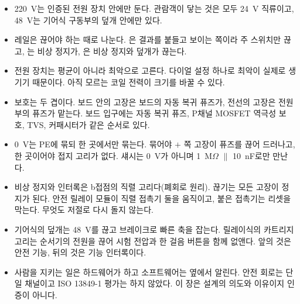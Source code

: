 \begin{itemize}
\item 220~V는 인증된 전원 장치 안에만 둔다. 관람객이 닿는 것은 모두 24~V 직류이고, 48~V는 기어식 구동부의 덮개 안에만 있다.
\item 레일은 끊어야 하는 때로 나눈다. 은 결과를 붙들고 보이는 쪽이라 주 스위치만 끊고, 는 비상 정지가, 은
비상 정지와 덮개가 끊는다.
\item 전원 장치는 평균이 아니라 최악으로 고른다. 다이얼 설정 하나로 최악이 실제로 생기기 때문이다. 아직 모르는 코일 전력이 크기를 바꿀 수 있다.
\item 보호는 두 겹이다. 보드 안의 고장은 보드의 자동 복귀 퓨즈가, 전선의 고장은 전원부의 퓨즈가 맡는다. 보드 입구에는 자동 복귀 퓨즈,
P채널 MOSFET 역극성 보호, TVS, 커패시터가 같은 순서로 있다.
\item 0~V는 PE에 묶되 한 곳에서만 묶는다. 묶어야 $+$ 쪽 고장이 퓨즈를 끊어 드러나고, 한 곳이어야 접지 고리가 없다. 섀시는 0~V가 아니며
1~M$\Omega$ $\parallel$ 10~nF로만 만난다.
\item 비상 정지와 인터록은 b접점의 직렬 고리다(폐회로 원리). 끊기는 모든 고장이 정지가 된다. 안전 릴레이 모듈이 직렬 접촉기 둘을 움직이고,
붙은 접촉기는 리셋을 막는다. 무엇도 저절로 다시 돌지 않는다.
\item 기어식의 덮개는 48~V를 끊고 브레이크로 빠른 축을 잡는다. 릴레이식의 카트리지 고리는 순서기의 전원을 끊어 시험 전압과 한 걸음 버튼을
함께 없앤다. 앞의 것은 안전 기능, 뒤의 것은 기능 인터록이다.
\item 사람을 지키는 일은 하드웨어가 하고 소프트웨어는 옆에서 알린다. 안전 회로는 단일 채널이고 ISO 13849-1 평가는 하지 않았다. 이 장은
설계의 의도와 이유이지 인증이 아니다.
\end{itemize}

